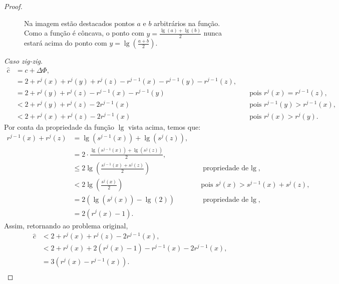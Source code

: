 \begin{proof}
\begin{figure}
    \caption{Na imagem estão destacados pontos $a$ e $b$ arbitrários na função. Como a função é côncava, o ponto com $y = \frac{\lg(a) + \lg(b)}{2}$ nunca estará acima do ponto com $y = \lg(\frac{a+b}{2})$.}
    \label{fig:log}
    \end{figure}
    
    \textit{Caso zig-zig}.   
    \begin{align*}
        \hat{c} &= c + \Delta \Phi,\\
        &= 2 + r^{j}(x) + r^{j}(y) + r^{j}(z) - r^{j-1}(x) - r^{j-1}(y) - r^{j-1}(z), \quad & \text{}\\
        &= 2 + r^{j}(y) + r^{j}(z) - r^{j-1}(x) - r^{j-1}(y) \quad & \text{pois $r^{j}(x) = r^{j-1}(z)$},\\
        &< 2 + r^{j}(y) + r^{j}(z) - 2r^{j-1}(x) \quad & \text{pois $r^{j-1}(y) > r^{j-1}(x)$}, \\
        &< 2 + r^{j}(x) + r^{j}(z) - 2r^{j-1}(x) \quad & \text{pois $r^{j}(x) > r^{j}(y)$}.
    \end{align*}
    Por conta da propriedade da função $\lg$ vista acima, temos que:
    \begin{align*}
        r^{j-1}(x) + r^{j}(z) &= \lg(s^{j-1}(x)) + \lg(s^{j}(z)), \quad & \text{}\\
        &= 2 \cdot \frac{\lg(s^{j-1}(x)) + \lg(s^{j}(z))}{2}, \quad & \text{} \\
        &\leq 2 \lg(\frac{s^{j-1}(x) + s^{j}(z)}{2}) \quad & \text{propriedade de $\lg$}, \\
        &< 2 \lg(\frac{s^{j}(x)}{2}) \quad & \text{pois $s^{j}(x) > s^{j-1}(x) + s^{j}(z)$}, \\
        &= 2 (\lg(s^{j}(x)) - \lg(2)) \quad & \text{propriedade de $\lg$}, \\
        &= 2 (r^{j}(x) - 1).
    \end{align*}
    Assim, retornando ao problema original,
    \begin{align*}
        \hat{c} &< 2 + r^{j}(x) + r^{j}(z) - 2r^{j-1}(x), \\
        &< 2 + r^{j}(x) +  2 (r^{j}(x) - 1) - r^{j-1}(x) - 2r^{j-1}(x), \\
        &= 3(r^{j}(x) - r^{j-1}(x)). \\
    \end{align*}


\end{proof}
